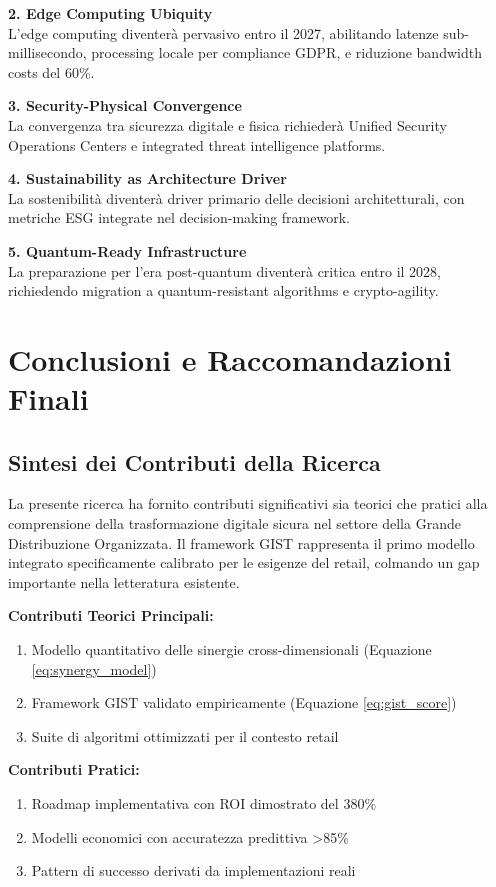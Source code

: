 \textbf{2. Edge Computing Ubiquity}\\
L'edge computing diventerà pervasivo entro il 2027, abilitando latenze sub-millisecondo, processing locale per compliance GDPR, e riduzione bandwidth costs del 60\%.

\textbf{3. Security-Physical Convergence}\\
La convergenza tra sicurezza digitale e fisica richiederà Unified Security Operations Centers e integrated threat intelligence platforms.

\textbf{4. Sustainability as Architecture Driver}\\
La sostenibilità diventerà driver primario delle decisioni architetturali, con metriche ESG integrate nel decision-making framework.

\textbf{5. Quantum-Ready Infrastructure}\\
La preparazione per l'era post-quantum diventerà critica entro il 2028, richiedendo migration a quantum-resistant algorithms e crypto-agility.

\section{Conclusioni e Raccomandazioni Finali}

\subsection{Sintesi dei Contributi della Ricerca}

La presente ricerca ha fornito contributi significativi sia teorici che pratici alla comprensione della trasformazione digitale sicura nel settore della Grande Distribuzione Organizzata. Il framework GIST rappresenta il primo modello integrato specificamente calibrato per le esigenze del retail, colmando un gap importante nella letteratura esistente.

\textbf{Contributi Teorici Principali:}
\begin{enumerate}
    \item Modello quantitativo delle sinergie cross-dimensionali (Equazione \ref{eq:synergy_model})
    \item Framework GIST validato empiricamente (Equazione \ref{eq:gist_score})
    \item Suite di algoritmi ottimizzati per il contesto retail
\end{enumerate}

\textbf{Contributi Pratici:}
\begin{enumerate}
    \item Roadmap implementativa con ROI dimostrato del 380\%
    \item Modelli economici con accuratezza predittiva >85\%
    \item Pattern di successo derivati da implementazioni reali
\end{enumerate}

